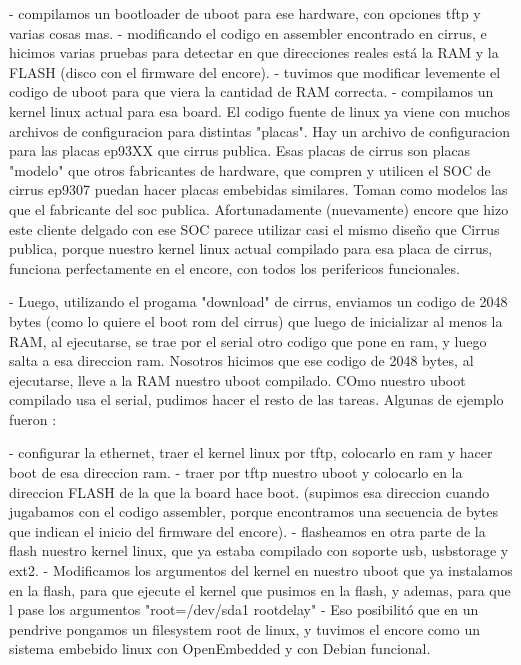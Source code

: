 \documentclass[conference]{IEEEtran}
\begin{document}
- compilamos un bootloader de uboot para ese hardware, con opciones tftp y varias cosas mas.
- modificando el codigo en assembler encontrado en cirrus, e hicimos varias pruebas para detectar
  en que direcciones reales está la RAM y la FLASH (disco con el firmware del encore).
- tuvimos que modificar levemente el codigo de uboot para que viera la cantidad de RAM correcta.
- compilamos un kernel linux actual para esa board. El codigo fuente de linux ya viene con 
  muchos archivos de configuracion para distintas "placas". Hay un archivo de configuracion
  para las placas ep93XX que cirrus publica. Esas placas de cirrus son placas "modelo"
  que otros fabricantes de hardware, que compren y utilicen el SOC de cirrus ep9307
  puedan hacer placas embebidas similares. Toman como modelos las que el fabricante
  del soc publica.
  Afortunadamente (nuevamente) encore que hizo este cliente delgado con ese SOC
  parece utilizar casi el mismo diseño que Cirrus publica, porque nuestro kernel linux
  actual compilado para esa placa de cirrus, funciona perfectamente en el encore,
  con todos los perifericos funcionales.

- Luego, utilizando el progama "download" de cirrus, enviamos un codigo de 2048
  bytes (como lo quiere el boot rom del cirrus) que luego de inicializar al menos la RAM, al ejecutarse,
  se trae por el serial otro codigo que pone en ram, y luego salta a esa direccion ram.
  Nosotros hicimos que ese codigo de 2048 bytes, al ejecutarse, lleve a la RAM nuestro
  uboot compilado. COmo nuestro uboot compilado usa el serial, pudimos hacer el resto
  de las tareas. Algunas de ejemplo fueron :

  - configurar la ethernet, traer el kernel linux por tftp, colocarlo en ram y hacer boot de esa direccion ram.
  - traer por tftp nuestro uboot y colocarlo en la direccion FLASH de la que la board hace boot.
    (supimos esa direccion cuando jugabamos con el codigo assembler, porque encontramos una secuencia de bytes que indican
    el inicio del firmware del encore).
  - flasheamos en otra parte de la flash nuestro kernel linux, que ya estaba compilado con soporte usb, usbstorage y ext2.
  - Modificamos los argumentos del kernel en nuestro uboot que ya instalamos en la flash, para que 
    ejecute el kernel que pusimos en la flash, y ademas, para que l pase los argumentos "root=/dev/sda1 rootdelay"
  - Eso posibilitó que en un pendrive pongamos un filesystem root de linux, y tuvimos el encore
    como un sistema embebido linux con OpenEmbedded y con Debian funcional.
\end{document}
